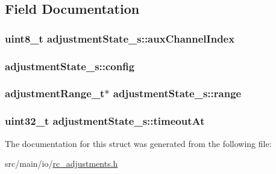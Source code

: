 \subsection{Field Documentation}
\hypertarget{structadjustmentState__s_a9878b9b6d0291b8429c50a95da18b157}{
\subsubsection[{aux\+Channel\+Index}]{\setlength{\rightskip}{0pt plus 5cm}uint8\+\_\+t adjustment\+State\+\_\+s\+::aux\+Channel\+Index}}\label{structadjustmentState__s_a9878b9b6d0291b8429c50a95da18b157}
\hypertarget{structadjustmentState__s_a8ae513ba533a8433e6e851807d2c686a}{
\subsubsection[{config}]{ adjustment\+State\+\_\+s\+::config}}\label{structadjustmentState__s_a8ae513ba533a8433e6e851807d2c686a}
\hypertarget{structadjustmentState__s_a5bafae6bc4f67d3cd0760f11bd80f67f}{
\subsubsection[{range}]{\setlength{\rightskip}{0pt plus 5cm}adjustment\+Range\+\_\+t$\ast$ adjustment\+State\+\_\+s\+::range}}\label{structadjustmentState__s_a5bafae6bc4f67d3cd0760f11bd80f67f}
\hypertarget{structadjustmentState__s_ace95b148ccd10341e032271da8240a3c}{
\subsubsection[{timeout\+At}]{\setlength{\rightskip}{0pt plus 5cm}uint32\+\_\+t adjustment\+State\+\_\+s\+::timeout\+At}}\label{structadjustmentState__s_ace95b148ccd10341e032271da8240a3c}


The documentation for this struct was generated from the following file\+:\begin{DoxyCompactItemize}
\item 
src/main/io/\hyperlink{io_2rc__adjustments_8h}{rc\+\_\+adjustments.\+h}\end{DoxyCompactItemize}
